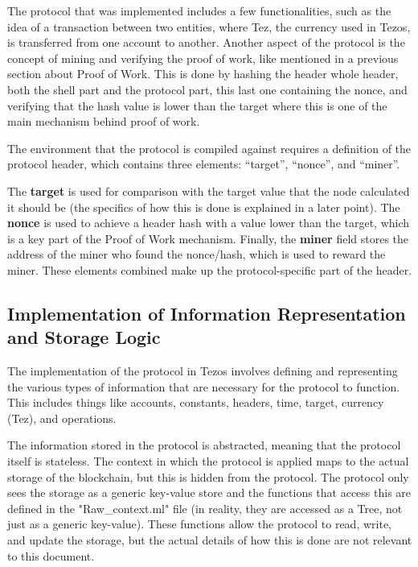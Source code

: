 The protocol that was implemented includes a few functionalities, such as the idea of a transaction between two entities, where Tez, the currency used in Tezos, is transferred from one account to another. 
Another aspect of the protocol is the concept of mining and verifying the proof of work, like mentioned in a previous section about Proof of Work.
This is done by hashing the header whole header, both the shell part and the protocol part, this last one containing the nonce, and verifying that the hash value is lower than the target where this is one of the main mechanism behind proof of work.

The environment that the protocol is compiled against requires a definition of the protocol header, which contains three elements: ``target'', ``nonce'', and ``miner''.

The \textbf{target} is used for comparison with the target value that the node calculated it should be (the specifics of how this is done is explained in a later point).
The \textbf{nonce} is used to achieve a header hash with a value lower than the target, which is a key part of the Proof of Work mechanism.
Finally, the \textbf{miner} field stores the address of the miner who found the nonce/hash, which is used to reward the miner. These elements combined make up the protocol-specific part of the header.


\subsection*{Implementation of Information Representation and Storage Logic}

The implementation of the protocol in Tezos involves defining and representing the various types of information that are necessary for the protocol to function. This includes things like accounts, constants, headers, time, target, currency (Tez), and operations.

The information stored in the protocol is abstracted, meaning that the protocol itself is stateless. The context in which the protocol is applied maps to the actual storage of the blockchain, but this is hidden from the protocol. The protocol only sees the storage as a generic key-value store and the functions that access this are defined in the "Raw\_context.ml" file (in reality, they are accessed as a Tree, not just as a generic key-value). These functions allow the protocol to read, write, and update the storage, but the actual details of how this is done are not relevant to this document.


